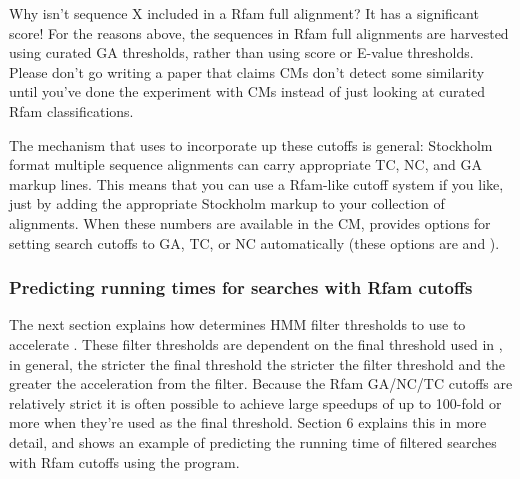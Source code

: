 \begin{srefaq}{Why isn't sequence X included in a Rfam full alignment?
It has a significant score!} For the reasons above, the sequences in
Rfam full alignments are harvested using curated GA
thresholds, rather than using score or E-value
thresholds. Please don't go writing a
paper that claims CMs don't detect some similarity until you've done
the experiment with CMs instead of just looking at curated Rfam
classifications. 
\end{srefaq}

The mechanism that  uses to incorporate up these cutoffs is
general: Stockholm format multiple sequence alignments can carry
appropriate TC, NC, and GA markup lines. This means that you can use a
Rfam-like cutoff system if you like, just by adding the appropriate
Stockholm markup to your collection of alignments. When these numbers
are available in the CM,  provides options
for setting search cutoffs to GA, TC, or NC automatically (these options
are  and ).

\subsubsection{Predicting running times for searches with Rfam cutoffs}
The next section explains how  determines HMM filter
thresholds to use to accelerate . These filter
thresholds are dependent on the final threshold used in
, in general, the stricter the final threshold the
stricter the filter threshold and the greater the acceleration from
the filter. Because the Rfam GA/NC/TC cutoffs are relatively strict it
is often possible to achieve large speedups of up to 100-fold or more
when they're used as the final threshold. Section 6 explains this in
more detail, and shows an example of predicting the running time of
filtered searches with Rfam cutoffs using the  program.



